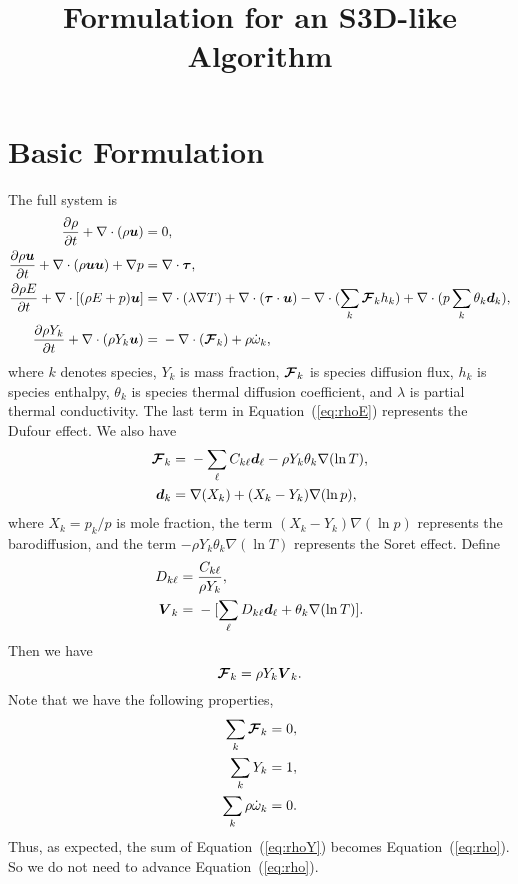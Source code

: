 \documentclass[11pt,letterpaper]{article}
\renewcommand{\vec}[1]{\mbox{\boldmath$#1$}}
\newcommand{\tensor}[1]{\mbox{\boldmath{\ensuremath{#1}}}}
\begin{document}
\title{Formulation for an S3D-like Algorithm}

\section{Basic Formulation}

The full system is 
\begin{align}
\frac{\partial \rho}{\partial t} + \nabla \cdot (\rho
    \vec{u})= { } & 0, \label{eq:rho} \\
\frac{\partial \rho \vec{u}}{\partial t} + \nabla \cdot (\rho
    \vec{u}\vec{u}) + \nabla p= { } & \nabla \cdot
  \tensor{\tau}, \\
\frac{\partial \rho E}{\partial t} + \nabla \cdot [(\rho E + p)
  \vec{u}] = { } & \nabla \cdot (\lambda \nabla T) + \nabla \cdot
  (\tensor{\tau} \cdot \vec{u}) - \nabla \cdot (\sum_k\vec{\mathcal{F}}_kh_k)
  + \nabla \cdot (p\sum_k \theta_k \vec{d}_k), \label{eq:rhoE} \\
\frac{\partial \rho Y_k}{\partial t} + \nabla \cdot (\rho Y_k \vec{u})
= { } & - \nabla \cdot (\vec{\mathcal{F}}_k) + \rho \dot{\omega}_k, \label{eq:rhoY}
\end{align}
where $k$ denotes species, $Y_k$ is mass fraction,
$\vec{\mathcal{F}}_k$ is species diffusion flux, $h_k$ is species
enthalpy, $\theta_k$ is species thermal diffusion coefficient, and
$\lambda$ is partial thermal conductivity.  The last term in
Equation~(\ref{eq:rhoE}) represents the Dufour effect.  We also have
\begin{align}
\vec{\mathcal{F}}_k = {} & -\sum_\ell C_{k\ell} \vec{d}_\ell - \rho Y_k \theta_k
  \nabla (\ln{T}), \\
\vec{d}_k = {} & \nabla(X_k) + (X_k - Y_k) \nabla
(\ln{p}), 
\end{align}
where $X_k = p_k / p$ is mole fraction, the term $(X_k - Y_k) \nabla
(\ln{p})$ represents the barodiffusion, and the term $- \rho Y_k
\theta_k \nabla (\ln{T})$ represents the Soret effect.  Define
\begin{align}
  D_{k\ell} = { } &\frac{C_{k\ell}}{\rho Y_k}, \\
  \vec{V}_k = { } & -[\sum_\ell D_{k\ell} \vec{d}_\ell + \theta_k
  \nabla (\ln{T})]. 
\end{align}
Then we have
\begin{equation}
\vec{\mathcal{F}}_k = \rho Y_k \vec{V}_k.
\end{equation}
Note that we have the following properties,
\begin{align}
\sum_k \vec{\mathcal{F}}_k = { } & 0, \\
\sum_k Y_k = { } & 1, \\
\sum_k \rho \dot{\omega}_k = { } & 0.
\end{align}
Thus, as expected, the sum of Equation~(\ref{eq:rhoY}) becomes
Equation~(\ref{eq:rho}).  So we do not need to advance
Equation~(\ref{eq:rho}). 
\end{document}
